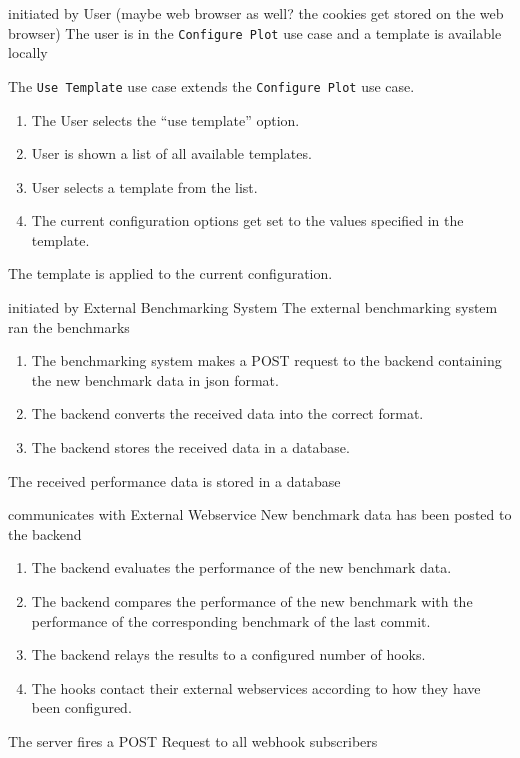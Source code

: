 {initiated by User (maybe web browser as well? the cookies get stored on the web browser)}
{The user is in the \texttt{Configure Plot} use case and a \gls{template} is available locally}
{The \texttt{Use Template} use case extends the \texttt{Configure Plot} use case.
\begin{enumerate}
    \item The User selects the \enquote{use template} option.
    \item User is shown a list of all available \glspl{template}.
    \item User selects a \gls{template} from the list.
    \item The current \gls{configuration} options get set to the values specified in the template.
\end{enumerate}} 
{The \gls{template} is applied to the current configuration.}

\bigskip

{initiated by External Benchmarking System}
{The external benchmarking system ran the benchmarks}
{\begin{enumerate}
    \item The benchmarking system makes a POST request to the backend containing the new benchmark data in \acrshort{json} format.
    \item The backend converts the received data into the correct format.
    \item The backend stores the received data in a database.
\end{enumerate}} 
{The received performance data is stored in a database}

\bigskip

{communicates with External Webservice}
{New benchmark data has been posted to the backend}
{\begin{enumerate}
    \item The backend evaluates the performance of the new benchmark data.
    \item The backend compares the performance of the new benchmark with the performance of the corresponding benchmark of the last commit.
    \item The backend relays the results to a configured number of hooks.
    \item The hooks contact their external webservices according to how they have been configured.
\end{enumerate}}
{The server fires a POST Request to all webhook subscribers}

